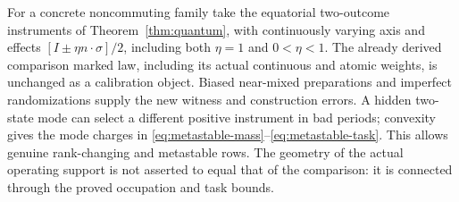For a concrete noncommuting family take the equatorial two-outcome instruments of Theorem~\ref{thm:quantum}, with continuously varying axis and effects $[I\pm\eta n\cdot\sigma]/2$, including both $\eta=1$ and $0<\eta<1$. The already derived comparison marked law, including its actual continuous and atomic weights, is unchanged as a calibration object. Biased near-mixed preparations and imperfect randomizations supply the new witness and construction errors. A hidden two-state mode can select a different positive instrument in bad periods; convexity gives the mode charges in \eqref{eq:metastable-mass}--\eqref{eq:metastable-task}. This allows genuine rank-changing and metastable rows. The geometry of the actual operating support is not asserted to equal that of the comparison: it is connected through the proved occupation and task bounds.
